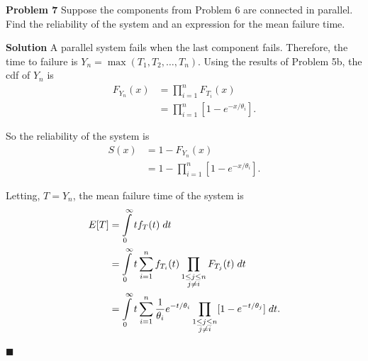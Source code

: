 \documentclass{article}
\newcommand{\mybox}{%
    \collectbox{%
        \setlength{\fboxsep}{1pt}%
        \fbox{\BOXCONTENT}%
    }%
}
\begin{document}
\vspace{7mm}

\noindent\mybox{\textbf{Problem 7}} Suppose the components from Problem 6 are connected in parallel.  Find the reliability of the system and an expression for the mean failure time.

\vspace{10mm}

\noindent\mybox{\textbf{Solution}}  A parallel system fails when the last component fails.  Therefore, the time to failure is $Y_n = \max(T_1, T_2, \ldots, T_n)$.  Using the results of Problem 5b, the cdf of $Y_n$ is 
\begin{align}
F_{Y_n}(x) &= \prod\limits_{i=1}^nF_{T_i}(x) \\
&= \prod\limits_{i=1}^n[1-e^{-x/\theta_i}].
\end{align}

\noindent So the reliability of the system is 
\begin{align}
S(x) &= 1 - F_{Y_n}(x) \\
&= 1-\prod\limits_{i=1}^n[1-e^{-x/\theta_i}].
\end{align}

\noindent Letting, $T=Y_n$, the mean failure time of the system is
\begin{align}
E[T] &= \int\limits_0^{\infty}tf_T(t) \hspace{1mm} dt \\
&= \int\limits_0^{\infty}t\sum\limits_{i=1}^nf_{T_i}(t)\prod\limits_{\substack{1\leq j \leq n \\ j\neq i}}F_{T_j}(t) \hspace{1mm} dt \\
&= \int\limits_0^{\infty}t\sum\limits_{i=1}^n\frac{1}{\theta_i}e^{-t/\theta_i}\prod\limits_{\substack{1\leq j \leq n \\ j\neq i}}[1-e^{-t/\theta_j}] \hspace{1mm} dt. 
\end{align}

\vspace{-2mm}
\hfill$\blacksquare$

\begin{center}
\vspace{-0.4cm}
\hrulefill \\
\vspace{-0.7cm}
\hrulefill
\end{center}

\vspace{7mm}
\end{document}
